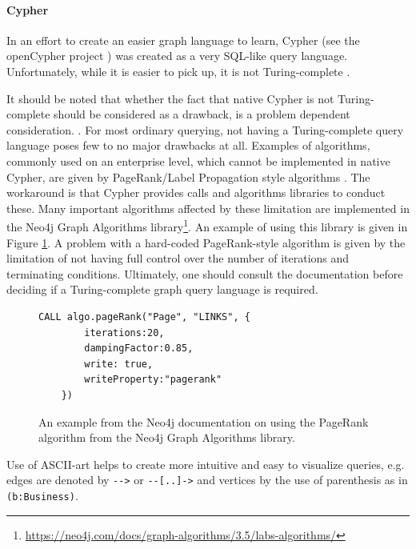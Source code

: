 \paragraph{Cypher}

In an effort to create an easier graph language to learn, Cypher (see the openCypher project \cite{openCypher}) was created as a very SQL-like query language. Unfortunately, while it is easier to pick up, it is not Turing-complete \cite{modernGraphQueryLang}. 

It should be noted that whether the fact that native Cypher is not Turing-complete should be considered as a drawback, is a problem dependent consideration. . For most ordinary querying, not having a Turing-complete query language poses few to no major drawbacks at all. Examples of algorithms, commonly used on an enterprise level, which cannot be implemented in native Cypher, are given by PageRank/Label Propagation style algorithms \cite{modernGraphQueryLang}. The workaround is that Cypher provides calls and algorithms libraries to conduct these. Many important algorithms affected by these limitation are implemented in the Neo4j Graph Algorithms library\footnote{\url{https://neo4j.com/docs/graph-algorithms/3.5/labs-algorithms/}}. An example of using this library is given in Figure \ref{lst:cypherPagerank}. A problem with a hard-coded PageRank-style algorithm is given by the limitation of not having full control over the number of iterations and terminating conditions. Ultimately, one should consult the documentation before deciding if a Turing-complete graph query language is required.

\begin{figure}[h]
    \centering
    \begin{lstlisting}[language=cypher]
    CALL algo.pageRank("Page", "LINKS", {
        iterations:20,
        dampingFactor:0.85,
        write: true,
        writeProperty:"pagerank"
    })
    \end{lstlisting}
    \caption{An example from the Neo4j documentation \cite{neo4jPageRank} on using the PageRank algorithm from the Neo4j Graph Algorithms library.}
    \label{lst:cypherPagerank}
\end{figure}

Use of ASCII-art helps to create more intuitive and easy to visualize queries, e.g. edges are denoted by \verb|-->| or \verb|--[..]->| and vertices by the use of parenthesis as in \verb|(b:Business)|.

